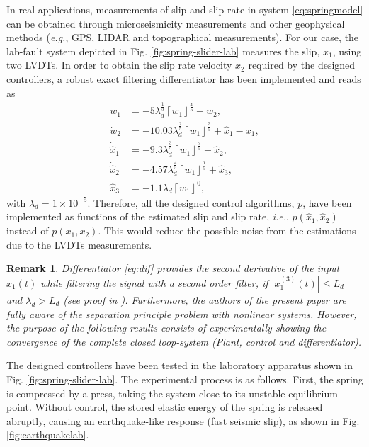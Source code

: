 \documentclass[journal,twoside,web]{ieeecolor}
\newcommand{\Sabs}[1]{\left\lceil #1 \right\rfloor}
\newcommand{\abs}[1]{\left| #1 \right|}
\newtheorem{remark}{Remark}
\begin{document}
In real applications, measurements of slip and slip-rate in system \eqref{eq:springmodel} can be obtained through microseismicity measurements and other geophysical methods (\textit{e.g.}, GPS, LIDAR and topographical measurements). For our case, the lab-fault system depicted in Fig. \ref{fig:spring-slider-lab} measures the slip, ${x}_{1}$, using two LVDTs. In order to obtain the slip rate velocity $x_2$ required by the designed controllers, a robust exact filtering differentiator \cite{b:Levant-Livne-2020} has been implemented and reads as
\begin{equation}
\begin{split}
  \dot{w}_1 &= -5 \lambda_d^{\frac{1}{5}}\Sabs{w_1}^{\frac{4}{5}}+w_2, \\
  \dot{w}_2 &= -10.03 \lambda_d^{\frac{2}{5}}\Sabs{w_1}^{\frac{3}{5}}+\hat{x}_1-x_1, \\
  \dot{\hat{x}}_1 &= -9.3 \lambda_d^{\frac{3}{5}}\Sabs{w_1}^{\frac{2}{5}}+\hat{x}_2, \\
  \dot{\hat{x}}_2 &= -4.57 \lambda_d^{\frac{4}{5}}\Sabs{w_1}^{\frac{1}{5}}+\hat{x}_3, \\
  \dot{\hat{x}}_3 &= -1.1 \lambda_d\Sabs{w_1}^{0},
\end{split}
\label{eq:dif}
\end{equation} 
with $\lambda_d=1\times 10^{-5}$. Therefore, all the designed control algorithms, $p$, have been implemented as functions of the estimated slip and slip rate, \textit{i.e.}, $p(\hat{x}_1,\hat{x}_2)$ instead of $p(x_1,x_2)$. This would reduce the possible noise from the estimations due to the LVDTs measurements.

\begin{remark}
Differentiator \eqref{eq:dif} provides the second derivative of the input $x_1(t)$ while filtering the signal with a second order filter, if $\abs{{x}_1^{(3)}(t)} \leq L_d$ and $\lambda_d > L_d$ (see proof in \cite{b:Levant-Livne-2020}). Furthermore, the authors of the present paper are fully aware of the separation principle problem with nonlinear systems. However, the purpose of the following results consists of experimentally showing the convergence of the complete closed loop-system (Plant, control and differentiator).
\end{remark}

The designed controllers have been tested in the laboratory apparatus shown in Fig. \ref{fig:spring-slider-lab}. The experimental process is as follows. First, the spring is compressed by a press, taking the system close to its unstable equilibrium point. Without control, the stored elastic energy of the spring is released abruptly, causing an earthquake-like response (fast seismic slip), as shown in Fig. \ref{fig:earthquakelab}.
\end{document}

